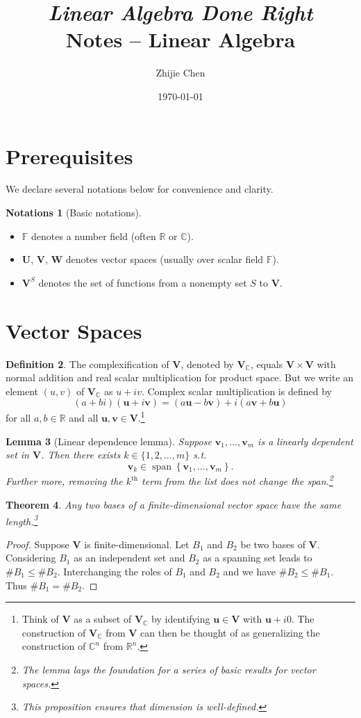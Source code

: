 \documentclass{tufte-handout}
\title{	
	\normalfont\normalsize 
	{\itshape Linear Algebra Done Right} \\ [0pt]
	\huge Notes -- Linear Algebra
}
\author{Zhijie Chen}
\date{\vspace{-5pt}\normalsize\today}
\def \v {\vspace{0.2cm}}
\theoremstyle{plain} %
\newtheorem{thm}{Theorem}
\newtheorem{lem}[thm]{Lemma}
\theoremstyle{definition}
\newtheorem{defn}[thm]{Definition}
\newtheorem{notns}[thm]{Notations}
\theoremstyle{remark}
\newcommand{\cbra}[1]{\mathopen{}\left\{#1\right\}}
\newcommand{\R}{\mathbb{R}}
\newcommand{\C}{\mathbb{C}}
\newcommand{\F}{\mathbb{F}}
\newcommand{\U}{\bm{U}}
\newcommand{\V}{\bm{V}}
\newcommand{\W}{\bm{W}}
\renewcommand{\u}{\bm{u}}
\renewcommand{\v}{\bm{v}}
\DeclareMathOperator{\spn}{span}
\begin{document}
\justifying
\maketitle
\tableofcontents
\newpage


\section{Prerequisites}
We declare several notations below for convenience and clarity.
\begin{notns}[Basic notations]
	\phantom{linebreak}

    \begin{itemize}
        \item $\F$ denotes a number field (often $\R$ or $\C$).
        \item $\U$, $\V$, $\W$ denotes vector spaces (usually over scalar field $\F$).
        \item $\V^S$ denotes the set of functions from a nonempty set $S$ to $\V$.
    \end{itemize}
\end{notns}


\section{Vector Spaces}
\begin{defn}
	The complexification of $\V$, denoted by $\V_\C$, equals $\V\times\V$ with normal addition and real scalar multiplication for product space. But we write an element $(u,v)$ of $\V_\C$ as $u+iv$. Complex scalar multiplication is defined by
	\[(a+bi)(\u+i\v)=(a\u-b\v)+i(a\v+b\u)\]
	for all $a,b\in\R$ and all $\u,\v\in\V$.\footnote{Think of $\V$ as a subset of $\V_\C$ by identifying $\u\in\V$ with $\u+i0$. The construction of $\V_\C$ from $\V$ can then be thought of as generalizing the construction of $\C^n$ from $\R^n$.}
\end{defn}

\begin{lem}[Linear dependence lemma]
	Suppose $\v_1,\dots,\v_m$ is a linearly dependent set in $\V$. Then there exists $k\in\{1,2,\dots,m\}$ s.t.
	\[\v_k\in\spn\cbra{\v_1,\dots,\v_m}.\]
	Further more, removing the $k^\text{th}$ term from the list does not change the span.\footnote{The lemma lays the foundation for a series of basic results for vector spaces.}
\end{lem}

\begin{thm}
	Any two bases of a finite-dimensional vector space have the same length.\footnote{This proposition ensures that \emph{dimension} is well-defined.}
\end{thm}
\begin{proof}
	Suppose $\V$ is finite-dimensional. Let $B_1$ and $B_2$ be two bases of $\V$. Considering $B_1$ as an independent set and $B_2$ as a spanning set leads to $\#B_1\leq\#B_2$. Interchanging the roles of $B_1$ and $B_2$ and we have $\#B_2\leq\#B_1$. Thus $\#B_1=\#B_2$.
\end{proof}
\end{document}
